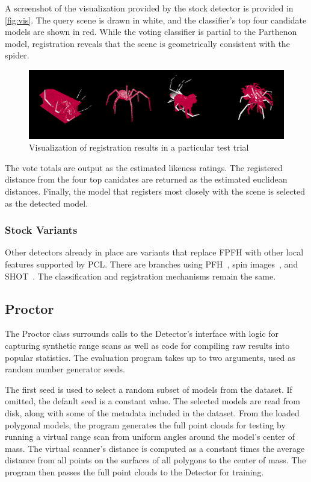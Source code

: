 A screenshot of the visualization provided by the stock detector is provided in \autoref{fig:vis}. The query scene is drawn in white, and the classifier's top four candidate models are shown in red. While the voting classifier is partial to the Parthenon model, registration reveals that the scene is geometrically consistent with the spider.
\begin{figure}[thpb]
  \centering
  \includegraphics[width=\columnwidth]{../figures/visualization.png}
  \caption{Visualization of registration results in a particular test trial}
  \label{fig:vis}
\end{figure}

The vote totals are output as the estimated likeness ratings.
The registered distance from the four top canidates are returned as the estimated euclidean distances.
Finally, the model that registers most closely with the scene is selected as the detected model.

\subsubsection{Stock Variants}
Other detectors already in place are variants that replace FPFH with other local features supported by PCL. There are branches using PFH~\cite{pfh1, pfh2}, spin images~\cite{SpinImages}, and SHOT~\cite{shot}.
The classification and registration mechanisms remain the same.

\subsection{Proctor}
The Proctor class surrounds calls to the Detector's interface with logic for capturing synthetic range scans as well as code for compiling raw results into popular statistics.
The evaluation program takes up to two arguments, used as random number generator seeds.

The first seed is used to select a random subset of models from the dataset. If omitted, the default seed is a constant value.
The selected models are read from disk, along with some of the metadata included in the dataset.
From the loaded polygonal models, the program generates the full point clouds for testing by running a virtual range scan from uniform angles around the model's center of mass.
The virtual scanner's distance is computed as a constant times the average distance from all points on the surfaces of all polygons to the center of mass.
The program then passes the full point clouds to the Detector for training.

